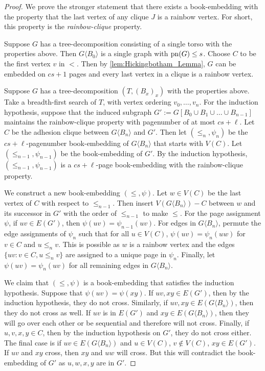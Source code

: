 \begin{proof}
	We prove the stronger statement that there exists a book-embedding with the property that the last vertex of any clique \(J\) is a rainbow vertex. For short, this property is the \textit{rainbow-clique} property. 

	Suppose $G$ has a tree-decomposition consisting of a single torso with the properties above. Then \(G\langle B_0 \rangle\) is a single graph with \(\operatorname{pn}(G) \leq s\). Choose \(C\) to be the first vertex \(v\) in \( < \). Then by \cref{lem:Hickingbotham_Lemma}, $G$ can be embedded on \(cs + 1\) pages and every last vertex in a clique is a rainbow vertex.

	Suppose $G$ has a tree-decomposition $(T, (B_x)_x)$ with the properties above. Take a breadth-first search of $T$, with vertex ordering $v_0, \ldots, v_n$. For the induction hypothesis, suppose that the induced subgraph $G' := G[B_0 \cup B_1 \cup \ldots \cup B_{n-1}]$ maintains the rainbow-clique property with pagenumber of at most \(cs + \ell\).  
	Let \(C\) be the adhesion clique between \(G \langle B_n \rangle\) and $G'$. Then let \((\leq_n, \psi_n)\) be the \(cs + \ell\)-pagenumber book-embedding of \(G \langle B_n \rangle\) that starts with \(V(C)\). Let \((\leq_{n-1}, \psi_{n-1})\) be the book-embedding of \(G'\). By the induction hypothesis, \((\leq_{n-1}, \psi_{n-1})\) is a \(cs + \ell\)-page book-embedding with the rainbow-clique property.

	We construct a new book-embedding \((\leq, \psi)\).
	Let \(w \in V(C)\) be the last vertex of \(C\) with respect to \(\leq_{n-1}\). Then insert \(V(G \langle B_n \rangle) - C\) between \(w\) and its successor in $G'$ with the order of \(\leq_{n-1}\) to make $\leq$. For the page assignment \(\psi\), if \(uv \in E(G')\), then \(\psi(uv) = \psi_{n-1}(uv)\). For edges in $G \langle B_n \rangle$, permute the edge assignments of \(\psi_n\) such that for all \(u \in V(C)\), \(\psi(uv) = \psi_n(uw)\) for $v \in C$ and $u \leq_n v$. This is possible as \(w\) is a rainbow vertex and the edges \(\{uv : v \in C, u \leq_n v\}\) are assigned to a unique page in \(\psi_n\). Finally, let \(\psi(uv) = \psi_n(uv)\) for all remaining edges in $G \langle B_n \rangle$. 

	We claim that \((\leq , \psi)\) is a book-embedding that satisfies the induction hypothesis. Suppose that \(\psi(uv) = \psi(xy)\). If \(uv, xy \in E(G')\), then by the induction hypothesis, they do not cross. Similarly, if \(uv, xy \in E(G \langle B_n \rangle)\), then they do not cross as well. If \(uv\) is in \(E(G')\) and \(xy \in E(G \langle B_n \rangle)\), then they will go over each other or be sequential and therefore will not cross.
	Finally, if \(u, v, x, y \in C\), then by the induction hypothesis on \(G'\), they do not cross either. The final case is if \(uv \in E(G\langle B_{n} \rangle)\) and \(u \in V(C)\), \(v \notin V(C)\), \(xy \in E(G')\). If \(uv\) and \(xy\) cross, then \(xy\) and \(uw\) will cross. But this will contradict the book-embedding of \(G'\) as $u, w, x, y$ are in $G'$.


\end{proof}
